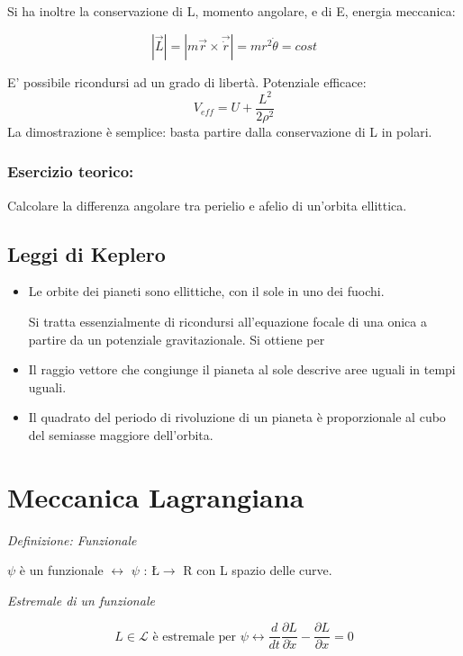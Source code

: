 \documentclass{article}
\begin{document}
Si ha inoltre la conservazione di L, momento angolare, e di E, energia meccanica:

\begin{equation}
    |\vec{L}|= |m\vec{r}\times \vec{\dot{r}}|= m r^2 \dot{\theta}= cost
\end{equation}


E' possibile ricondursi ad un grado di libertà.
Potenziale efficace:
\begin{equation}
    V_{eff}=U+\frac{L^2}{2\rho^2}
\end{equation}
La dimostrazione è semplice: basta partire dalla conservazione di L in polari.


\subsubsection*{Esercizio teorico:}
Calcolare la differenza angolare tra perielio e afelio di un'orbita ellittica.

\subsection*{Leggi di Keplero}
\begin{itemize}
    \item Le orbite dei pianeti sono ellittiche, con il sole in uno dei fuochi.

          Si tratta essenzialmente di ricondursi all'equazione focale di una onica a partire da un potenziale gravitazionale.
          Si ottiene per

    \item Il raggio vettore che congiunge il pianeta al sole descrive aree uguali in tempi uguali.
    \item Il quadrato del periodo di rivoluzione di un pianeta è proporzionale al cubo del semiasse maggiore dell'orbita.
\end{itemize}



\section{Meccanica Lagrangiana}

\textit{Definizione: Funzionale}

$\psi$ è un funzionale $\leftrightarrow$ $\psi$ : \L $\rightarrow$ R
con L spazio delle curve.

\textit{Estremale di un funzionale}

\begin{equation}
    L \in \mathcal{L} \text{ è estremale per } \psi \leftrightarrow \frac{d}{dt} \frac{\partial L}{\partial \dot{x}} - \frac{\partial L}{\partial x} = 0
\end{equation}
\end{document}
